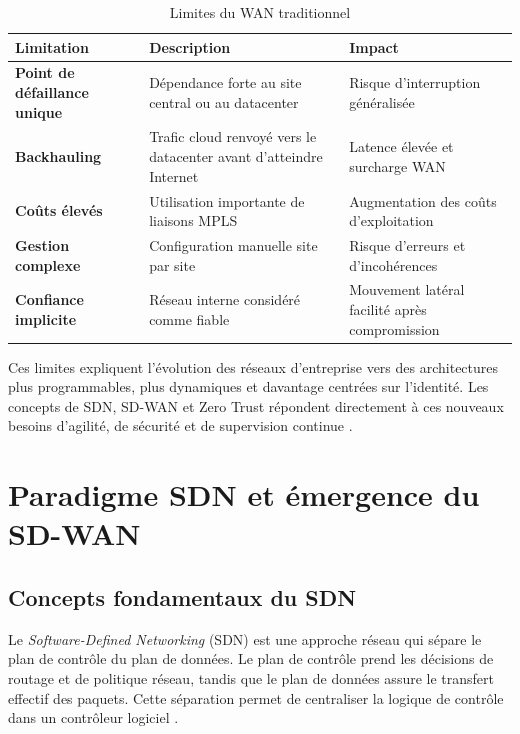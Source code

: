 \documentclass[12pt,a4paper,oneside]{report}
\begin{document}
	\begin{table}[H]
		\centering
		\caption{Limites du WAN traditionnel}
		\label{tab:limites-wan-traditionnel}
		\renewcommand{\arraystretch}{1.4}
		\begin{tabularx}{\textwidth}{|>{\bfseries}p{3.8cm}|X|p{3.5cm}|}
			\hline
			\textbf{Limitation} & \textbf{Description} & \textbf{Impact} \\
			\hline
			Point de défaillance unique &
			Dépendance forte au site central ou au datacenter &
			Risque d'interruption généralisée \\
			\hline
			Backhauling &
			Trafic cloud renvoyé vers le datacenter avant d'atteindre Internet &
			Latence élevée et surcharge WAN \\
			\hline
			Coûts élevés &
			Utilisation importante de liaisons MPLS &
			Augmentation des coûts d'exploitation \\
			\hline
			Gestion complexe &
			Configuration manuelle site par site &
			Risque d'erreurs et d'incohérences \\
			\hline
			Confiance implicite &
			Réseau interne considéré comme fiable &
			Mouvement latéral facilité après compromission \\
			\hline
		\end{tabularx}
	\end{table}
	
	Ces limites expliquent l'évolution des réseaux d'entreprise vers des architectures plus programmables, plus dynamiques et davantage centrées sur l'identité. Les concepts de SDN, SD-WAN et Zero Trust répondent directement à ces nouveaux besoins d'agilité, de sécurité et de supervision continue \cite{onf_sdn_arch,nist_zero_trust,cisco_sdw_design}.
	
	\section{Paradigme SDN et émergence du SD-WAN}
	
	\subsection{Concepts fondamentaux du SDN}
	
	Le \textit{Software-Defined Networking} (SDN) est une approche réseau qui sépare le plan de contrôle du plan de données. Le plan de contrôle prend les décisions de routage et de politique réseau, tandis que le plan de données assure le transfert effectif des paquets. Cette séparation permet de centraliser la logique de contrôle dans un contrôleur logiciel \cite{onf_sdn_arch}.
	
\end{document}
